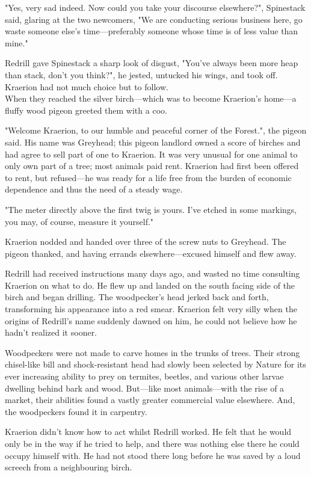 "Yes, very sad indeed. Now could you take your discourse elsewhere?", Spinestack said, glaring at the two newcomers, "We are conducting serious business here, go waste someone else's time---preferably someone whose time is of less value than mine."

Redrill gave Spinestack a sharp look of disgust, "You've always been more heap than stack, don't you think?", he jested, untucked his wings, and took off. Kraerion had not much choice but to follow.\\

When they reached the silver birch---which was to become Kraerion's home---a fluffy wood pigeon greeted them with a coo. 

"Welcome Kraerion, to our humble and peaceful corner of the Forest.", the pigeon said. His name was Greyhead; this pigeon landlord owned a score of birches and had agree to sell part of one to Kraerion. It was very unusual for one animal to only own part of a tree; most animals paid rent. Kraerion had first been offered to rent, but refused---he was ready for a life free from the burden of economic dependence and thus the need of a steady wage.

"The meter directly above the first twig is yours. I've etched in some markings, you may, of course, measure it yourself."

Kraerion nodded and handed over three of the screw nuts to Greyhead. The pigeon thanked, and having errands elsewhere---excused himself and flew away.

Redrill had received instructions many days ago, and wasted no time consulting Kraerion on what to do. He flew up and landed on the south facing side of the birch and began drilling. The woodpecker's head jerked back and forth, transforming his appearance into a red smear. Kraerion felt very silly when the origins of Redrill's name suddenly dawned on him, he could not believe how he hadn't realized it sooner.

Woodpeckers were not made to carve homes in the trunks of trees. Their strong chisel-like bill and shock-resistant head had slowly been selected by Nature for its ever increasing ability to prey on termites, beetles, and various other larvae dwelling behind bark and wood. But---like most animals---with the rise of a market, their abilities found a vastly greater commercial value elsewhere. And, the woodpeckers found it in carpentry.

Kraerion didn't know how to act whilst Redrill worked. He felt that he would only be in the way if he tried to help, and there was nothing else there he could occupy himself with. He had not stood there long before he was saved by a loud screech from a neighbouring birch.

